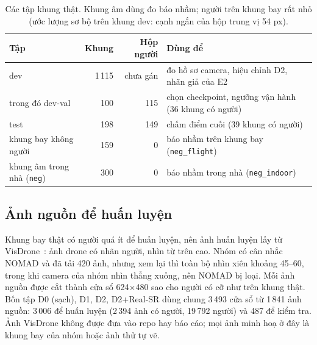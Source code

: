 \begin{table}[!htbp]
\centering\footnotesize
\caption[Các tập khung thật]{Các tập khung thật. Khung âm dùng đo báo nhầm; người trên khung bay rất nhỏ (ước lượng sơ bộ trên khung dev: cạnh ngắn của hộp trung vị 54 px).}
\label{tab:split}
\begin{tabularx}{\textwidth}{@{}l r r X@{}}
\toprule
Tập & Khung & Hộp người & Dùng để \\
\midrule
dev & 1\,115 & chưa gán & đo hồ sơ camera, hiệu chỉnh D2, nhãn giả của E2 \\
\quad trong đó dev-val & 100 & 115 & chọn checkpoint, ngưỡng vận hành (36 khung có người) \\
test & 198 & 149 & chấm điểm cuối (39 khung có người) \\
\quad khung bay không người & 159 & 0 & báo nhầm trên khung bay (\texttt{neg\_flight}) \\
khung âm trong nhà (\texttt{neg}) & 300 & 0 & báo nhầm trong nhà (\texttt{neg\_indoor}) \\
\bottomrule
\end{tabularx}
\end{table}

\subsection{Ảnh nguồn để huấn luyện}

Khung bay thật có người quá ít để huấn luyện, nên ảnh huấn luyện lấy từ VisDrone~\cite{visdrone}: ảnh drone có nhãn người, nhìn từ trên cao. Nhóm có cân nhắc NOMAD và đã tải 420 ảnh, nhưng xem lại thì toàn bộ nhìn xiên khoảng 45–60\textdegree, trong khi camera của nhóm nhìn thẳng xuống, nên NOMAD bị loại. Mỗi ảnh nguồn được cắt thành cửa sổ 624$\times$480 sao cho người có cỡ như trên khung thật. Bốn tập D0 (sạch), D1, D2, D2+Real-SR dùng chung 3\,493 cửa sổ từ 1\,841 ảnh nguồn: 3\,006 để huấn luyện (2\,394 ảnh có người, 19\,792 người) và 487 để kiểm tra. Ảnh VisDrone không được đưa vào repo hay báo cáo; mọi ảnh minh hoạ ở đây là khung bay của nhóm hoặc ảnh thử tự vẽ.
